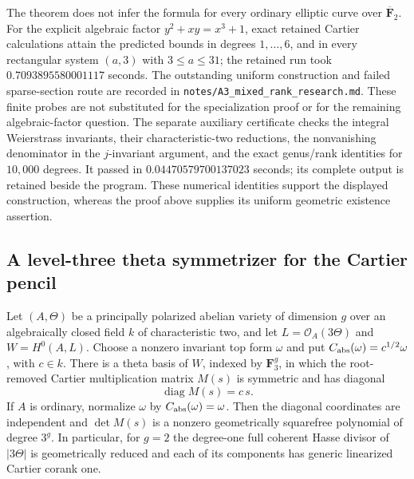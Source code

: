 \begin{remark}
\label{rem:DE-A3-mixed-fixed-refinement}
The theorem does not infer the formula for every ordinary elliptic
curve over $\overline{\mathbf F}_2$.  For the explicit algebraic
factor $y^2+xy=x^3+1$, exact retained Cartier calculations attain
the predicted bounds in degrees $1,\ldots,6$, and in every
rectangular system $(a,3)$ with $3\le a\le31$; the retained run
took $0.7093895580001117$ seconds.  The outstanding uniform
construction and failed sparse-section route are recorded in
\texttt{notes/A3\_mixed\_rank\_research.md}.  These finite probes
are not substituted for the specialization proof or for the
remaining algebraic-factor question.
The separate auxiliary certificate
checks the integral Weierstrass invariants, their characteristic-two
reductions, the nonvanishing denominator in the $j$-invariant argument,
and the exact genus/rank identities for $10{,}000$ degrees.  It passed
in $0.04470579700137023$ seconds; its complete output is retained
beside the program.  These numerical identities support the displayed
construction, whereas the proof above supplies its uniform geometric
existence assertion.
\end{remark}




\subsection{A level-three theta symmetrizer for the Cartier pencil}
\label{subsec:ppav-theta-Cartier-symmetrizer}

\begin{theorem}\label{thm:ppav-level3-Cartier-symmetric}
Let $(A,\Theta)$ be a principally polarized abelian variety of dimension
$g$ over an algebraically closed field $k$ of characteristic two, and let
$L=\mathcal O_A(3\Theta)$ and $W=H^0(A,L)$.
Choose a nonzero invariant top form $\omega$ and put
$C_{\rm abs}(\omega)=c^{1/2}\omega$, with $c\in k$.
There is a theta basis of $W$, indexed by $\mathbf F_3^g$, in which
the root-removed Cartier multiplication matrix $M(s)$ is symmetric
and has diagonal
\[
                         \operatorname{diag}M(s)=c\,s.
\]
If $A$ is ordinary, normalize $\omega$ by $C_{\rm abs}(\omega)=\omega$.
Then the diagonal coordinates are independent and $\det M(s)$ is a
nonzero geometrically squarefree polynomial of degree $3^g$.
In particular, for $g=2$ the degree-one full coherent Hasse divisor of
$|3\Theta|$ is geometrically reduced and each of its components has
generic linearized Cartier corank one.
\end{theorem}

